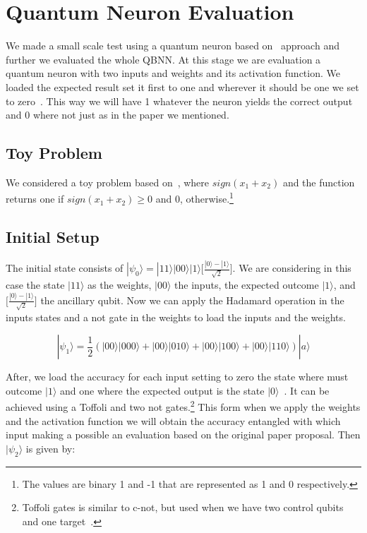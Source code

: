 \documentclass[conference]{IEEEtran}
\begin{document}
\section{Quantum Neuron Evaluation}\label{sec:quantum-neuron-evaluation}

 We made a small scale test using a quantum neuron based on~\cite{fawaz2019training} approach and further we evaluated
 the whole QBNN\@.
 At this stage we are evaluation a quantum neuron with two inputs and weights and its activation function.
 We loaded the expected result set it first to one and wherever it should be one we set to zero~\cite{fawaz2019training}.
 This way we will have 1 whatever the neuron yields the correct output and 0 where not just as in the paper we mentioned.

 \subsection*{Toy Problem}
    We considered a toy problem based on~\cite{fawaz2019training}, where \(sign(x_1 + x_2)\) and the function returns one
    if \(sign(x_1 + x_2) \geq 0\) and 0, otherwise.\footnote{The values are binary 1 and -1 that are represented as 1
    and 0 respectively.}

\subsection{Initial Setup}\label{subsec:initial-setup}


The initial state consists of \(|\psi_0\rangle = |11\rangle|00\rangle|1\rangle\Big[\frac{|0\rangle - |1\rangle}{\sqrt{2}}\Big]\).
We are considering in this case the state \(|11\rangle\) as the weights, \(|00\rangle\) the inputs, the expected outcome \(|1\rangle\), and
\(\Big[\frac{|0\rangle - |1\rangle}{\sqrt{2}}\Big]\) the ancillary qubit.
Now we can apply the Hadamard operation in the inputs states and a not gate in the weights to load the inputs and the weights.

\begin{equation}
|\psi_1\rangle = \frac{1}{2}(|00\rangle|000\rangle + |00\rangle|010\rangle + |00\rangle|100\rangle + |00\rangle|110\rangle)
|a\rangle
\end{equation}

After, we load the accuracy for each input setting to zero the state where must outcome \(|1\rangle\) and one where the
expected output is the state $|0\rangle$~\cite{fawaz2019training}.
It can be achieved using a Toffoli and two not gates.\footnote{Toffoli gates is similar to c-not, but used when we have
two control qubits and one target~\cite{yanofsky2008quantum}.}
This form when we apply the weights and the activation function we will obtain the accuracy entangled with which input
making a possible an evaluation based on the original paper proposal.
Then \(|\psi_2\rangle\) is given by:
\end{document}
